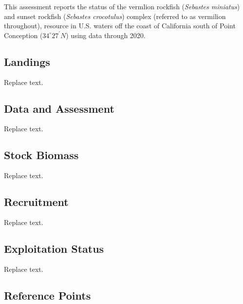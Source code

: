 \documentclass[
  english,
  a4paper,
]{article}
\begin{document}
This assessment reports the status of the vermlion rockfish (\emph{Sebastes miniatus})
and sunset rockfish (\emph{Sebastes crocotulus}) complex (referred to as vermilion
throughout), resource in U.S. waters off the coast of California south
of Point Conception ($34^\circ 27^\prime N$) using data
through 2020.

\hypertarget{landings}{%
\subsection*{Landings}\label{landings}}

Replace text.

\hypertarget{data-and-assessment}{%
\subsection*{Data and Assessment}\label{data-and-assessment}}

Replace text.

\hypertarget{stock-biomass}{%
\subsection*{Stock Biomass}\label{stock-biomass}}

Replace text.

\hypertarget{recruitment}{%
\subsection*{Recruitment}\label{recruitment}}

Replace text.

\hypertarget{exploitation-status}{%
\subsection*{Exploitation Status}\label{exploitation-status}}

Replace text.

\hypertarget{reference-points}{%
\subsection*{Reference Points}\label{reference-points}}
\end{document}

